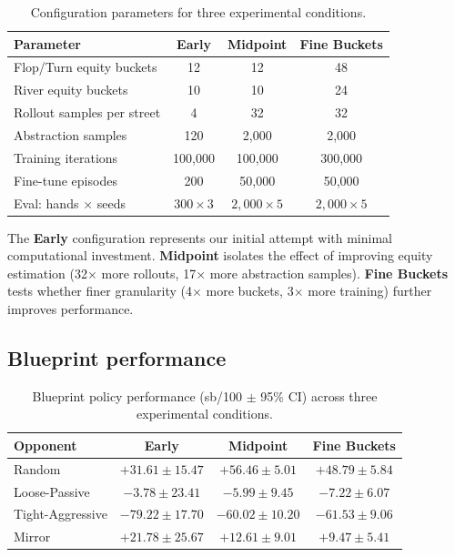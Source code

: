 \documentclass{article}
\begin{document}
\begin{table}[h]
\centering
\caption{Configuration parameters for three experimental conditions.}
\label{tab:configs}
\begin{tabular}{@{}lccc@{}}
\toprule
\textbf{Parameter} & \textbf{Early} & \textbf{Midpoint} & \textbf{Fine Buckets} \\
\midrule
Flop/Turn equity buckets & 12 & 12 & 48 \\
River equity buckets & 10 & 10 & 24 \\
Rollout samples per street & 4 & 32 & 32 \\
Abstraction samples & 120 & 2{,}000 & 2{,}000 \\
Training iterations & 100{,}000 & 100{,}000 & 300{,}000 \\
Fine-tune episodes & 200 & 50{,}000 & 50{,}000 \\
Eval: hands $\times$ seeds & $300 \times 3$ & $2{,}000 \times 5$ & $2{,}000 \times 5$ \\
\bottomrule
\end{tabular}
\end{table}

The \textbf{Early} configuration represents our initial attempt with minimal computational investment. \textbf{Midpoint} isolates the effect of improving equity estimation (32$\times$ more rollouts, 17$\times$ more abstraction samples). \textbf{Fine Buckets} tests whether finer granularity (4$\times$ more buckets, 3$\times$ more training) further improves performance.

\subsection{Blueprint performance}

\begin{table}[h]
\centering
\caption{Blueprint policy performance (sb/100 $\pm$ 95\% CI) across three experimental conditions.}
\label{tab:blueprint}
\begin{tabular}{@{}lccc@{}}
\toprule
\textbf{Opponent} & \textbf{Early} & \textbf{Midpoint} & \textbf{Fine Buckets} \\
\midrule
Random       & $+31.61 \pm 15.47$ & $\mathbf{+56.46 \pm 5.01}$ & $+48.79 \pm 5.84$ \\
Loose-Passive & $-3.78 \pm 23.41$ & $-5.99 \pm 9.45$  & $-7.22 \pm 6.07$ \\
Tight-Aggressive & $-79.22 \pm 17.70$ & $\mathbf{-60.02 \pm 10.20}$ & $-61.53 \pm 9.06$ \\
Mirror       & $+21.78 \pm 25.67$ & $+12.61 \pm 9.01$ & $+9.47 \pm 5.41$ \\
\bottomrule
\end{tabular}
\end{table}
\end{document}
